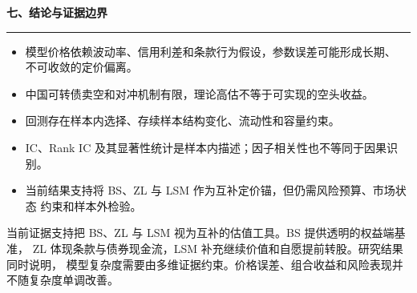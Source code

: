 \documentclass[11pt,a4paper]{ctexart}
\newcommand{\sectionbar}[1]{%
  \vspace{0.4em}
  {\color{navy}\Large\bfseries #1}\par
  \vspace{0.2em}
  {\color{blue}\rule{\textwidth}{1.2pt}}\par
}
\begin{document}
\sectionbar{七、结论与证据边界}

\begin{itemize}
  \item 模型价格依赖波动率、信用利差和条款行为假设，参数误差可能形成长期、
        不可收敛的定价偏离。
  \item 中国可转债卖空和对冲机制有限，理论高估不等于可实现的空头收益。
  \item 回测存在样本内选择、存续样本结构变化、流动性和容量约束。
  \item IC、Rank IC 及其显著性统计是样本内描述；因子相关性也不等同于因果识别。
  \item 当前结果支持将 BS、ZL 与 LSM 作为互补定价锚，但仍需风险预算、市场状态
        约束和样本外检验。
\end{itemize}

当前证据支持把 BS、ZL 与 LSM 视为互补的估值工具。BS 提供透明的权益端基准，
ZL 体现条款与债券现金流，LSM 补充继续价值和自愿提前转股。研究结果同时说明，
模型复杂度需要由多维证据约束。价格误差、组合收益和风险表现并不随复杂度单调改善。
\end{document}
